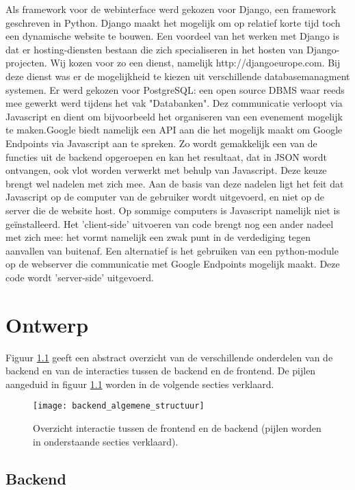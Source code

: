 Als framework voor de webinterface werd gekozen voor Django, een framework geschreven in Python. Django maakt het mogelijk om op relatief korte tijd toch een dynamische website te bouwen.
Een voordeel van het werken met Django is dat er hosting-diensten bestaan die zich specialiseren in het hosten van Django-projecten. Wij kozen voor zo een dienst, namelijk http://djangoeurope.com.
Bij deze dienst was er de mogelijkheid te kiezen uit verschillende databasemanagment systemen. Er werd gekozen voor PostgreSQL: een open source DBMS waar reeds mee gewerkt werd tijdens het vak "Databanken".
Dez communicatie verloopt via Javascript en dient om bijvoorbeeld het organiseren van een evenement mogelijk te maken.Google biedt namelijk een API aan die het mogelijk maakt om Google Endpoints via Javascript aan te spreken. Zo wordt gemakkelijk een van de functies uit de backend opgeroepen en kan het resultaat, dat in JSON wordt ontvangen, ook vlot worden verwerkt met behulp van Javascript. Deze keuze brengt wel nadelen met zich mee. Aan de basis van deze nadelen ligt het feit dat Javascript op de computer van de gebruiker wordt uitgevoerd, en niet op de server die de website host. Op sommige computers is Javascript namelijk niet is geïnstalleerd. Het 'client-side' uitvoeren van code brengt nog een ander nadeel met zich mee: het vormt namelijk een zwak punt in de verdediging tegen aanvallen van buitenaf. Een alternatief is het gebruiken van een python-module op de webserver die communicatie met Google Endpoints mogelijk maakt. Deze code wordt 'server-side' uitgevoerd.


\chapter{Ontwerp}
Figuur \ref{fig:algemene structuur backend} geeft een abstract overzicht van de verschillende onderdelen van de backend en van de interacties tussen de backend en de frontend. De pijlen aangeduid in figuur \ref{fig:algemene structuur backend} worden in de volgende secties verklaard.

\begin{figure}[H]
	\centering
	\texttt{[image: backend\_algemene\_structuur]}
	\caption{Overzicht interactie tussen de frontend en de backend (pijlen worden in onderstaande secties verklaard).}
	\label{fig:algemene structuur backend}
	
\end{figure}
\section{Backend}
